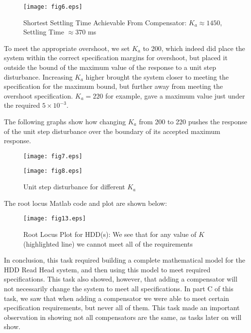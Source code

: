 \documentclass{article}
\newcommand{\matlab}[1]{%
%
}
\begin{document}
\matlab{fig6.m}

\begin{figure}[H]
  \caption{Shortest Settling Time Achievable From Compensator: 
  $K_a \approx 1450$, Settling Time $\approx 370$ ms}
  \centering
  \texttt{[image: fig6.eps]}
\end{figure}

To meet the appropriate overshoot, we set $K_a$ to 200, which
indeed did place the system within the correct specification margins for
overshoot, but placed it outside the bound of the maximum value of the response
 to a unit step disturbance. Increasing $K_a$ higher brought the system
closer to meeting the specification for the maximum bound, but further away from
meeting the overshoot specification. $K_a = 220$ for example, gave a maximum
value just under the required $5\times 10^{-3}$.

The following graphs show how changing $K_a$ from 200 to 220 pushes
the response of the unit step disturbance over the boundary of its
accepted maximum response.

\begin{figure}\centering
  \begin{minipage}{0.5\linewidth}
    \matlab{fig7.m}%
  \end{minipage}%
  \begin{minipage}{0.5\linewidth}
    \matlab{fig8.m}
  \end{minipage}%
\end{figure}

\begin{figure}[H]\centering
  \caption{Unit step disturbance for different $K_a$}
  \begin{minipage}{9cm}
    \texttt{[image: fig7.eps]}
  \end{minipage}%
  \begin{minipage}{9cm}
    \texttt{[image: fig8.eps]}
  \end{minipage}
\end{figure}

The root locus Matlab code and plot are shown below:
\matlab{fig13.m}
\begin{figure}[H]
  \caption{Root Locus Plot for HDD(s): We see that for any value of $K$ 
  (highlighted line) we cannot meet all of the requirements}
  \centering
  \texttt{[image: fig13.eps]}
\end{figure}

In conclusion, this task required building a complete mathematical model for
the HDD Read Head system, and then using this model to meet required
specifications. This task also showed, however, that adding a compensator will
not necessarily change the system to meet all specifications. In part C of
this task, we saw that when adding a compensator we were able to meet certain
specification requirements, but never all of them. This task made an important
observation in showing not all compensators are the same, as tasks later on
will show.
\end{document}
